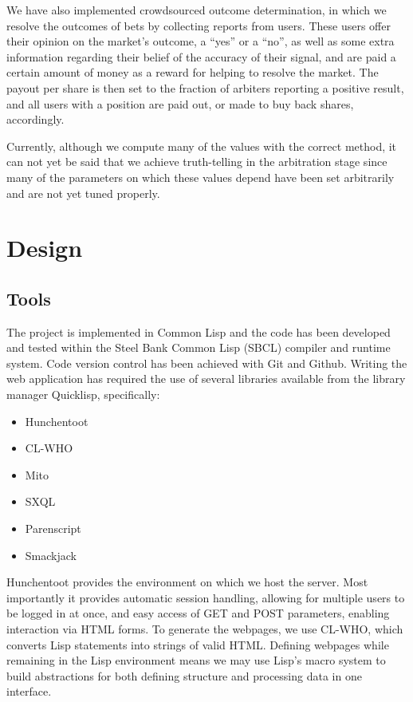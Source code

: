 \documentclass[10pt,a4paper]{article}
\theoremstyle{plain}
\theoremstyle{definition}
\begin{document}
We have also implemented crowdsourced outcome determination, in which we
resolve the outcomes of bets by collecting reports from users. These users
offer their opinion on the market's outcome, a ``yes'' or a ``no'', as well as
some extra information regarding their belief of the accuracy of their signal,
and are paid a certain amount of money as a reward for helping to resolve the
market. The payout per share is then set to the fraction of arbiters reporting
a positive result, and all users with a position are paid out, or made to buy
back shares, accordingly.

Currently, although we compute many of the values with the correct method, it
can not yet be said that we achieve truth-telling in the arbitration stage
since many of the parameters on which these values depend have been set
arbitrarily and are not yet tuned properly.

\section{Design}

\label{sec:design}

\subsection{Tools}

The project is implemented in Common Lisp and the code has been developed and
tested within the Steel Bank Common Lisp (SBCL) compiler and runtime system.
Code version control has been achieved with Git and Github.  Writing the web
application has required the use of several libraries available from the
library manager Quicklisp, specifically:

\begin{itemize}
	\itemsep0em
	\item Hunchentoot
	\item CL-WHO
	\item Mito
	\item SXQL
	\item Parenscript
	\item Smackjack
\end{itemize}

Hunchentoot provides the environment on which we host the server. Most
importantly it provides automatic session handling, allowing for multiple users
to be logged in at once, and easy access of GET and POST parameters, enabling
interaction via HTML forms. To generate the webpages, we use CL-WHO, which
converts Lisp statements into strings of valid HTML. Defining webpages while
remaining in the Lisp environment means we may use Lisp's macro system to build
abstractions for both defining structure and processing data in one interface.
\end{document}
